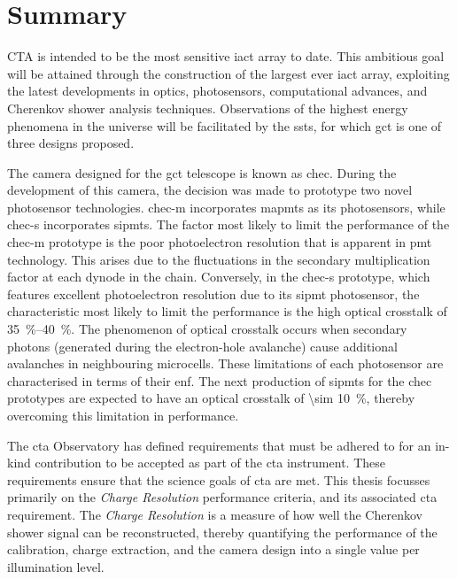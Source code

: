 \chapter{\label{ch9-summary}Summary} 

CTA is intended to be the most sensitive \gls{iact} array to date. This ambitious goal will be attained through the construction of the largest ever \gls{iact} array, exploiting the latest developments in optics, photosensors, computational advances, and Cherenkov shower analysis techniques. Observations of the highest energy phenomena in the universe will be facilitated by the \glspl{sst}, for which \gls{gct} is one of three designs proposed.

The camera designed for the \gls{gct} telescope is known as \gls{chec}. During the development of this camera, the decision was made to prototype two novel photosensor technologies. \gls{chec-m} incorporates \glspl{mapmt} as its photosensors, while \gls{chec-s} incorporates \glspl{sipmt}. The factor most likely to limit the performance of the \gls{chec-m} prototype is the poor photoelectron resolution that is apparent in \gls{pmt} technology. This arises due to the fluctuations in the secondary multiplication factor at each dynode in the chain. Conversely, in the \gls{chec-s} prototype, which features excellent photoelectron resolution due to its \gls{sipmt} photosensor, the characteristic most likely to limit the performance is the high optical crosstalk of \SIrange{35}{40}{\percent}. The phenomenon of optical crosstalk occurs when secondary photons (generated during the electron-hole avalanche) cause additional avalanches in neighbouring microcells. These limitations of each photosensor are characterised in terms of their \gls{enf}. The next production of \glspl{sipmt} for the \gls{chec} prototypes are expected to have an optical crosstalk of \SI{\sim 10}{\percent}, thereby overcoming this limitation in performance.

The \gls{cta} Observatory has defined requirements that must be adhered to for an in-kind contribution to be accepted as part of the \gls{cta} instrument. These requirements ensure that the science goals of \gls{cta} are met. This thesis focusses primarily on the \textit{Charge Resolution} performance criteria, and its associated \gls{cta} requirement. The \textit{Charge Resolution} is a measure of how well the Cherenkov shower signal can be reconstructed, thereby quantifying the performance of the calibration, charge extraction, and the camera design into a single value per illumination level.

